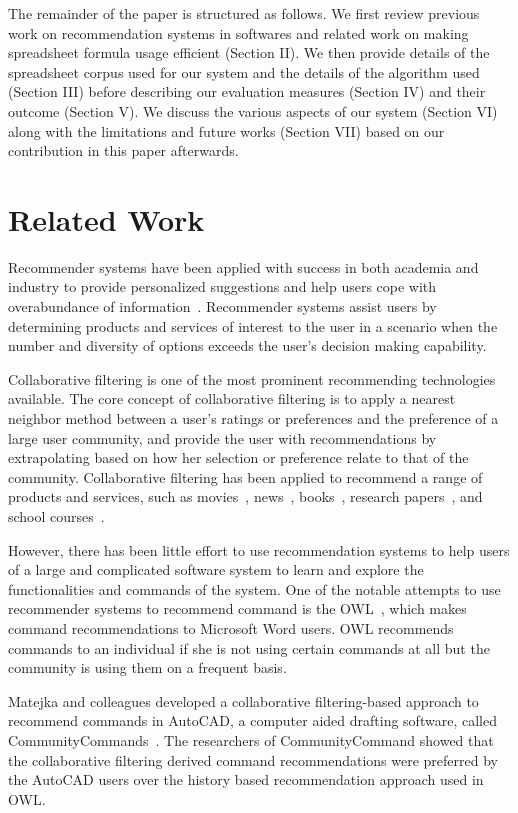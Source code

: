 \documentclass[conference]{IEEEtran}
\begin{document}
The remainder of the paper is structured as follows. We first review previous work on recommendation systems in softwares and related work on making spreadsheet formula usage efficient (Section II). We then provide details of the spreadsheet corpus used for our system and the details of the algorithm used (Section III) before describing our evaluation measures (Section IV) and their outcome (Section V). We discuss the various aspects of our system (Section VI) along with the limitations and future works (Section VII) based on our contribution in this paper afterwards.

\section{Related Work}
Recommender systems have been applied with success in both academia and industry to provide personalized suggestions and help users cope with overabundance of information~\cite{hill1995recommending, resnick1994grouplens,shardanand1995social}. Recommender systems assist users by determining  products and services of interest to the user in a scenario when the number and diversity of options exceeds the user's decision making capability. 

Collaborative filtering is one of the most prominent recommending technologies available. The core concept of collaborative filtering is to apply a nearest neighbor method between a user's ratings or preferences and the preference of a large user community, and provide the user with recommendations by extrapolating based on how her selection or preference relate to that of the community. Collaborative filtering has been applied to recommend a range of products and services, such as movies~\cite{miller2003movielens}, news~\cite{resnick1994grouplens}, books~\cite{linden2003amazon, liu2003adaptive}, research papers~\cite{mcnee2006don}, and school courses~\cite{farzan2006social, hsu2008personalized}. 

However, there has been little effort to use recommendation systems to help users of a large and complicated software system to learn and explore the functionalities and commands of the system. One of the notable attempts to use recommender systems to recommend command is the OWL~\cite{linton2000owl}, which makes command recommendations to Microsoft Word users. OWL recommends commands to an individual if she is not using certain commands at all but the community is using them on a frequent basis.

Matejka and colleagues developed a collaborative filtering-based approach to recommend commands in AutoCAD, a computer aided drafting software, called CommunityCommands~\cite{matejka2009communitycommands}. The researchers of CommunityCommand showed that the collaborative filtering derived command recommendations were preferred by the AutoCAD users over the history based recommendation approach used in OWL.
\end{document}
